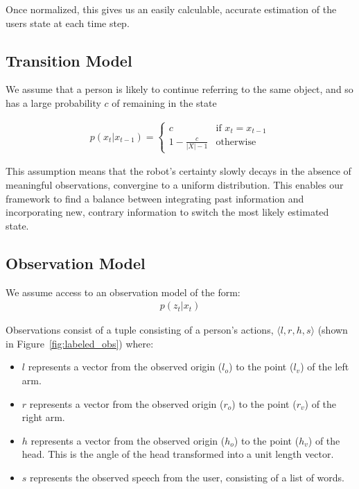 \documentclass[a4paper, 11pt]{article} %
\begin{document}
Once normalized, this gives us an easily calculable, accurate estimation of the users state at each time step.
\subsection{Transition Model}
We assume that a person is likely to continue referring to the same
object, and so has a large probability $c$ of remaining in the state

\begin{align}
p(x_t | x_{t-1}) = \left\{  \begin{array}{ll}
c&\mbox{if } x_t = x_{t-1}\\
1-\frac{c}{|X|-1}&\mbox{otherwise}
\end{array}\right.
\end{align}

This assumption means that the robot's certainty slowly decays in the absence of meaningful observations, convergine to a uniform distribution. This enables our framework to find a balance between integrating past information and incorporating new, contrary information to switch the most likely estimated state.
\subsection{Observation Model}
We assume access to an observation model of the form:
\begin{align}
p(z_t | x_t)
\end{align}

Observations consist of a tuple consisting of a person's actions,
$\langle l, r, h, s\rangle $ (shown in Figure~\ref{fig:labeled_obs}) where:
\begin{itemize}
    \item $l$ represents a vector from the observed origin ($l_o$) to the point ($l_v$) of the left arm.
    \item $r$ represents a vector from the observed origin ($r_o$) to the point ($r_v$) of the right arm.
    \item $h$ represents a vector from the observed origin ($h_o$) to the point ($h_v$) of the head. This is the angle of the head transformed into a unit length vector.
    \item $s$ represents the observed speech from the user,
          consisting of a list of words.
    \end{itemize}
\end{document}
